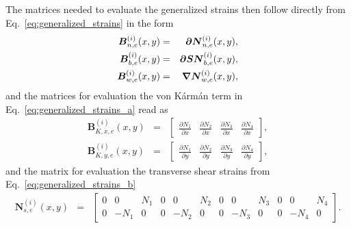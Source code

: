 \documentclass[11pt]{article}
\newcommand{\del}[2]{\mbox{$\displaystyle\frac{#1}{#2}$}}
\newcommand{\ppd}[2]{\del{\partial {#1}}{\partial{#2}}}
\newcommand{\layer}[1]{^{(#1)}}
\newcommand{\elen}{_{n,e}}
\newcommand{\eleb}{_{b,e}}
\newcommand{\eles}{_{s,e}}
\newcommand{\eleNLx}{_{K,x,e}}
\newcommand{\eleNLy}{_{K,y,e}}
\newcommand{\M}[1]{{\boldsymbol #1}}
\newcommand{\elew}{_{w,e}}
\begin{document}
The matrices needed to evaluate the generalized strains then follow directly
from Eq.~\eqref{eq:generalized_strains} in the form
\begin{eqnarray*}
\M{B}\layer{i}\elen(x,y)
&=& 
 \pard \M{N}\layer{i}\elen(x,y),\\
\M{B}\layer{i}\eleb(x,y)
&=& 
 \pard \mtrx{S} \M{N}\layer{i}\eleb(x,y),\\
\M{B}\layer{i}\elew(x,y)
&=&
\M{\nabla}
\M{N}\layer{i}\elew(x,y),
\end{eqnarray*}
and the matrices for evaluation the von K\'{a}rm\'{a}n term in Eq.~\eqref{eq:generalized_strains_a} read as
\begin{eqnarray*}
\M{B}\layer{i}\eleNLx(x,y)
&=&
\begin{bmatrix}
\ppd{N_1}{x} & \ppd{N_2}{x} & \ppd{N_3}{x} & \ppd{N_4}{x} 
\end{bmatrix},\\
\M{B}\layer{i}\eleNLy(x,y)
&=&
\begin{bmatrix}
\ppd{N_1}{y} & \ppd{N_2}{y} & \ppd{N_3}{y} & \ppd{N_4}{y}
\end{bmatrix},
\end{eqnarray*}
and the matrix for evaluation the transverse shear strains from Eq.~\eqref{eq:generalized_strains_b}
\begin{eqnarray*}
\M{N}\layer{i}\eles(x,y)
&=& 
\left[
\begin{array}{cccccccccccc}
0 & 0 & N_1 & 0 & 0 & N_2 & 0 & 0 & N_3 & 0 & 0 & N_4 \\
0 & -N_1 & 0 & 0 & -N_2 & 0 & 0 & -N_3 & 0 & 0 & -N_4 & 0
\end{array}
\right].
\end{eqnarray*}
\end{document}
